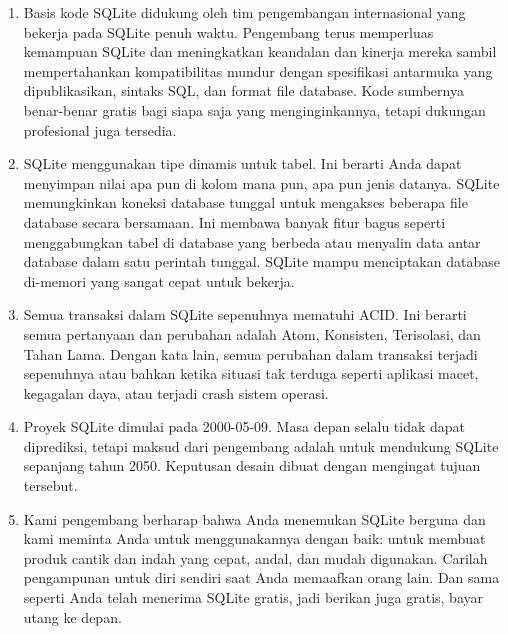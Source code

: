 \begin{enumerate}
\begin{enumerate}
				\item Basis kode SQLite didukung oleh tim pengembangan internasional yang bekerja pada SQLite penuh waktu. Pengembang terus memperluas kemampuan SQLite dan meningkatkan keandalan dan kinerja mereka sambil mempertahankan kompatibilitas mundur dengan spesifikasi antarmuka yang dipublikasikan, sintaks SQL, dan format file database. Kode sumbernya benar-benar gratis bagi siapa saja yang menginginkannya, tetapi dukungan profesional juga tersedia.
				\item SQLite menggunakan tipe dinamis untuk tabel. Ini berarti Anda dapat menyimpan nilai apa pun di kolom mana pun, apa pun jenis datanya. SQLite memungkinkan koneksi database tunggal untuk mengakses beberapa file database secara bersamaan. Ini membawa banyak fitur bagus seperti menggabungkan tabel di database yang berbeda atau menyalin data antar database dalam satu perintah tunggal. SQLite mampu menciptakan database di-memori yang sangat cepat untuk bekerja.
				\item Semua transaksi dalam SQLite sepenuhnya mematuhi ACID. Ini berarti semua pertanyaan dan perubahan adalah Atom, Konsisten, Terisolasi, dan Tahan Lama. Dengan kata lain, semua perubahan dalam transaksi terjadi sepenuhnya atau bahkan ketika situasi tak terduga seperti aplikasi macet, kegagalan daya, atau terjadi crash sistem operasi.
				\item Proyek SQLite dimulai pada 2000-05-09. Masa depan selalu tidak dapat diprediksi, tetapi maksud dari pengembang adalah untuk mendukung SQLite sepanjang tahun 2050. Keputusan desain dibuat dengan mengingat tujuan tersebut.
				\item Kami pengembang berharap bahwa Anda menemukan SQLite berguna dan kami meminta Anda untuk menggunakannya dengan baik: untuk membuat produk cantik dan indah yang cepat, andal, dan mudah digunakan. Carilah pengampunan untuk diri sendiri saat Anda memaafkan orang lain. Dan sama seperti Anda telah menerima SQLite gratis, jadi berikan juga gratis, bayar utang ke depan.

			\end{enumerate}

\end{enumerate}
